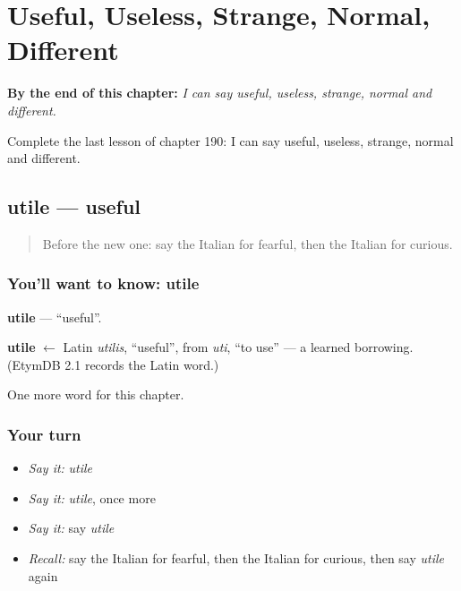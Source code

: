 
\chapter{Useful, Useless, Strange, Normal, Different}
\label{ch:it-useful-useless-strange-normal-different}

\begin{chapteropening}
\textbf{By the end of this chapter:} \emph{I can say useful, useless, strange, normal and different.}

Complete the last lesson of chapter 190: I can say useful, useless, strange, normal and different.
\end{chapteropening}

\section[utile]{utile — useful}

\label{lesson:IT-C190-utile}



\begin{quote}
Before the new one: say the Italian for fearful, then the Italian for curious.
\end{quote}

\subsection*{You'll want to know: utile}
\textbf{utile} — \textquotedblleft{}useful\textquotedblright{}.

\begin{cousinweb}
\textbf{utile} $\leftarrow$ Latin \emph{utilis}, \textquotedblleft{}useful\textquotedblright{}, from \emph{uti}, \textquotedblleft{}to use\textquotedblright{} — a learned borrowing. (EtymDB 2.1 records the Latin word.)
\end{cousinweb}

\begin{grammarlens}[title={What you've built}]
One more word for this chapter.
\end{grammarlens}

\subsection*{Your turn}
\begin{itemize}
\raggedright
  \item \emph{Say it:} \emph{utile}
  \item \emph{Say it:} \emph{utile}, once more
  \item \emph{Say it:} say \emph{utile}
  \item \emph{Recall:} say the Italian for fearful, then the Italian for curious, then say \emph{utile} again
\end{itemize}

